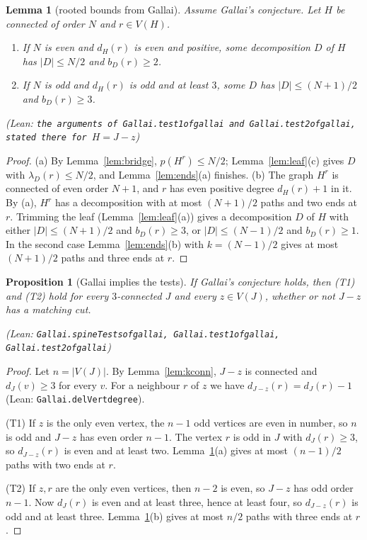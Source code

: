 \documentclass[11pt]{amsart}
\newtheorem{lemma}[theorem]{Lemma}
\newtheorem{proposition}[theorem]{Proposition}
\theoremstyle{definition}
\theoremstyle{remark}
\renewcommand{\_}{\oldunderscore\allowbreak}
\newcommand{\lean}[1]{\textup{(Lean: {\small\texttt{#1}})}}
\newcommand{\leanst}[1]{\par{\raggedright\small\textup{(Lean: \texttt{#1})}\par}}
\begin{document}
\begin{lemma}[rooted bounds from Gallai]\label{lem:gallai-rooted}
Assume Gallai's conjecture. Let $H$ be connected of order $N$ and $r\in V(H)$.
\begin{enumerate}[label=\textup{(\alph*)}]
\item If $N$ is even and $d_H(r)$ is even and positive, some decomposition $D$ of $H$ has
$|D|\le N/2$ and $b_D(r)\ge2$.
\item If $N$ is odd and $d_H(r)$ is odd and at least $3$, some $D$ has $|D|\le(N+1)/2$ and
$b_D(r)\ge3$.
\end{enumerate}
\leanst{the arguments of Gallai.test1\_of\_gallai and Gallai.test2\_of\_gallai, stated there for
$H=J-z$}
\end{lemma}

\begin{proof}
(a) By Lemma~\ref{lem:bridge}, $p(H^r)\le N/2$; Lemma~\ref{lem:leaf}(c) gives $D$ with
$\lambda_D(r)\le N/2$, and Lemma~\ref{lem:ends}(a) finishes. (b) The graph $H^r$ is connected of even
order $N+1$, and $r$ has even positive degree $d_H(r)+1$ in it. By (a), $H^r$ has a decomposition
with at most $(N+1)/2$ paths and two ends at $r$. Trimming the leaf (Lemma~\ref{lem:leaf}(a)) gives a
decomposition $D$ of $H$ with either $|D|\le(N+1)/2$ and $b_D(r)\ge3$, or $|D|\le(N-1)/2$ and
$b_D(r)\ge1$. In the second case Lemma~\ref{lem:ends}(b) with $k=(N-1)/2$ gives at most $(N+1)/2$
paths and three ends at $r$.
\end{proof}

\begin{proposition}[Gallai implies the tests]\label{prop:forward}
If Gallai's conjecture holds, then \textup{(T1)} and \textup{(T2)} hold for every $3$-connected $J$
and every $z\in V(J)$, whether or not $J-z$ has a matching cut.
\leanst{Gallai.spineTests\_of\_gallai, Gallai.test1\_of\_gallai, Gallai.test2\_of\_gallai}
\end{proposition}

\begin{proof}
Let $n=|V(J)|$. By Lemma~\ref{lem:kconn}, $J-z$ is connected and $d_J(v)\ge3$ for every $v$. For a
neighbour $r$ of $z$ we have $d_{J-z}(r)=d_J(r)-1$ \lean{Gallai.delVert\_degree}.

(T1) If $z$ is the only even vertex, the $n-1$ odd vertices are even in number, so $n$ is odd and
$J-z$ has even order $n-1$. The vertex $r$ is odd in $J$ with $d_J(r)\ge3$, so $d_{J-z}(r)$ is even
and at least two. Lemma~\ref{lem:gallai-rooted}(a) gives at most $(n-1)/2$ paths with two ends at
$r$.

(T2) If $z,r$ are the only even vertices, then $n-2$ is even, so $J-z$ has odd order $n-1$. Now
$d_J(r)$ is even and at least three, hence at least four, so $d_{J-z}(r)$ is odd and at least three.
Lemma~\ref{lem:gallai-rooted}(b) gives at most $n/2$ paths with three ends at $r$.
\end{proof}
\end{document}
